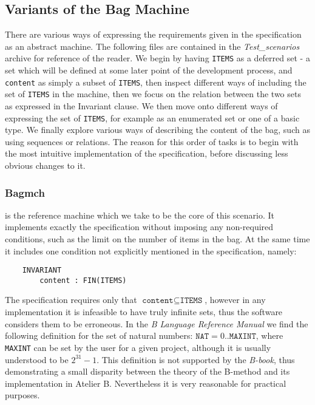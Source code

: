 \documentclass[11pt,journal]{IEEEtran}
\begin{document}
	\subsection{Variants of the Bag Machine}
	There are various ways of expressing the requirements given in the specification as an abstract machine. The following files are contained in the \emph{Test\_scenarios} archive for reference of the reader. We begin by having \texttt{ITEMS} as a deferred set - a set which will be defined at some later point of the development process, and \texttt{content} as simply a subset of \texttt{ITEMS}, then inspect different ways of including the set of \texttt{ITEMS} in the machine, then we focus on the relation between the two sets as expressed in the Invariant clause. We then move onto different ways of expressing the set of \texttt{ITEMS}, for example as an enumerated set or one of a basic type. We finally explore various ways of describing the content of the bag, such as using sequences or relations. The reason for this order of tasks is to begin with the most intuitive implementation of the specification, before discussing less obvious changes to it.
	
	\subsubsection{Bagmch} is the reference machine which we take to be the core of this scenario. It implements exactly the specification without imposing any non-required conditions, such as the limit on the number of items in the bag. At the same time it includes one condition not explicitly mentioned in the specification, namely:
	\begin{lstlisting}
	INVARIANT
		content : FIN(ITEMS)
	\end{lstlisting}

	The specification requires only that $\texttt{content} \subseteq \texttt{ITEMS}$, however in any implementation it is infeasible to have truly infinite sets, thus the software considers them to be erroneous. In the \emph{B Language Reference Manual}\cite{b reference} we find the following definition for the set of natural numbers: ${\texttt{NAT}  = 0 .. \texttt{MAXINT}}$, where \texttt{MAXINT} can be set by the user for a given project, although it is usually understood to be $2^{31}-1$. This definition is not supported by the \emph{B-book}, thus demonstrating a small disparity between the theory of the B-method and its implementation in Atelier B. Nevertheless it is very reasonable for practical purposes.
	
\end{document}
